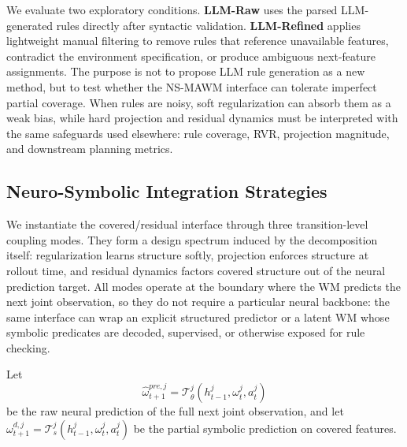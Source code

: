 \documentclass{article}
\theoremstyle{plain}
\theoremstyle{definition}
\theoremstyle{remark}
\begin{document}
We evaluate two exploratory conditions. \textbf{LLM-Raw} uses the parsed LLM-generated rules directly after syntactic validation. \textbf{LLM-Refined} applies lightweight manual filtering to remove rules that reference unavailable features, contradict the environment specification, or produce ambiguous next-feature assignments. The purpose is not to propose LLM rule generation as a new method, but to test whether the NS-MAWM interface can tolerate imperfect partial coverage. When rules are noisy, soft regularization can absorb them as a weak bias, while hard projection and residual dynamics must be interpreted with the same safeguards used elsewhere: rule coverage, RVR, projection magnitude, and downstream planning metrics.


\subsection{Neuro-Symbolic Integration Strategies}
\label{sec:strategies}

We instantiate the covered/residual interface through three transition-level coupling modes. They form a design spectrum induced by the decomposition itself: regularization learns structure softly, projection enforces structure at rollout time, and residual dynamics factors covered structure out of the neural prediction target. All modes operate at the boundary where the WM predicts the next joint observation, so they do not require a particular neural backbone: the same interface can wrap an explicit structured predictor or a latent WM whose symbolic predicates are decoded, supervised, or otherwise exposed for rule checking.

Let
\begin{equation}
  \hat{\omega}^{pre,j}_{t+1}
  =
  \mathcal{T}^j_{\theta}(h^j_{t-1}, \omega^j_t, a^j_t)
  \label{eq:raw_neural_prediction}
\end{equation}
be the raw neural prediction of the full next joint observation, and let
$\omega^{d,j}_{t+1} = \mathcal{T}^j_s(h^j_{t-1}, \omega^j_t, a^j_t)$
be the partial symbolic prediction on covered features.
\end{document}
